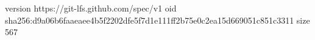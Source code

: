 version https://git-lfs.github.com/spec/v1
oid sha256:d9a06b6faaeaee4b5f2202dfe5f7d1e111ff2b75e0c2ea15d669051c851c3311
size 567
